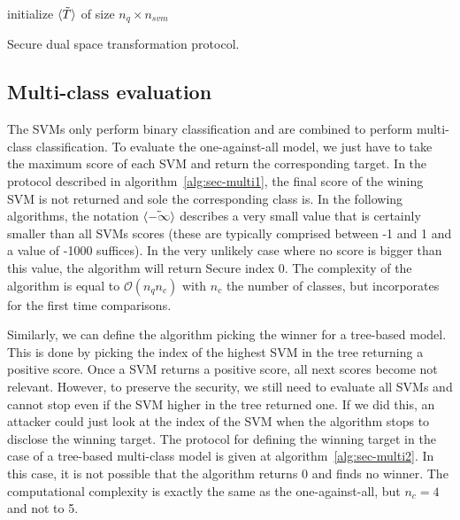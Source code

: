 \begin{center}
\begin{algorithm}[H]
\DontPrintSemicolon
initialize $\langle \tilde{T} \rangle$ of size $n_q \times n_{svm}$ \;
\caption{Secure dual space transformation protocol.}
\label{alg:sec-rbfsvm}
\end{algorithm}
\end{center}

\subsection{Multi-class evaluation}
The SVMs only perform binary classification and are combined to perform multi-class classification. To evaluate the one-against-all model, we just have to take the maximum score of each SVM and return the corresponding target. In the protocol described in algorithm~\ref{alg:sec-multi1}, the final score of the wining SVM is not returned and sole the corresponding class is. In the following algorithms, the notation $\langle \tilde{-\infty} \rangle$ describes a very small value that is certainly smaller than all SVMs scores (these are typically comprised between -1 and 1 and a value of -1000 suffices). In the very unlikely case where no score is bigger than this value, the algorithm will return Secure index 0. The complexity of the algorithm is equal to $\mathcal{O}(n_qn_c)$ with $n_c$ the number of classes, but incorporates for the first time comparisons.

Similarly, we can define the algorithm picking the winner for a tree-based model. This is done by picking the index of the highest SVM in the tree returning a positive score. Once a SVM returns a positive score, all next scores become not relevant. However, to preserve the security, we still need to evaluate all SVMs and cannot stop even if the SVM higher in the tree returned one. If we did this, an attacker could just look at the index of the SVM when the algorithm stops to disclose the winning target. The protocol for defining the winning target in the case of a tree-based multi-class model is given at algorithm~\ref{alg:sec-multi2}. In this case, it is not possible that the algorithm returns 0 and finds no winner. The computational complexity is exactly the same as the one-against-all, but $n_c = 4$ and not to 5.

